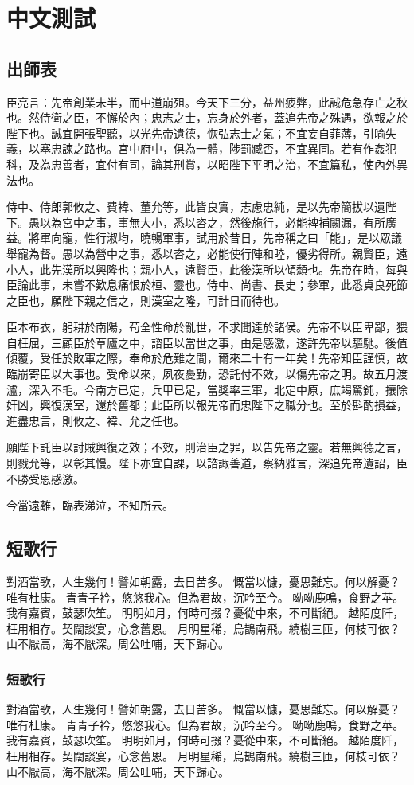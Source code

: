 
\chapter{中文測試}
\label{chp:chinese}

\section{出師表}

臣亮言：先帝創業未半，而中道崩殂。今天下三分，益州疲弊，此誠危急存亡之秋也。然侍衛之臣，不懈於內；忠志之士，忘身於外者，蓋追先帝之殊遇，欲報之於陛下也。誠宜開張聖聽，以光先帝遺德，恢弘志士之氣；不宜妄自菲薄，引喻失義，以塞忠諫之路也。宮中府中，俱為一體，陟罰臧否，不宜異同。若有作姦犯科，及為忠善者，宜付有司，論其刑賞，以昭陛下平明之治，不宜篇私，使內外異法也。\par

侍中、侍郎郭攸之、費褘、董允等，此皆良實，志慮忠純，是以先帝簡拔以遺陛下。愚以為宮中之事，事無大小，悉以咨之，然後施行，必能裨補闕漏，有所廣益。將軍向寵，性行淑均，曉暢軍事，試用於昔日，先帝稱之曰「能」，是以眾議舉寵為督。愚以為營中之事，悉以咨之，必能使行陣和睦，優劣得所。親賢臣，遠小人，此先漢所以興隆也；親小人，遠賢臣，此後漢所以傾頹也。先帝在時，每與臣論此事，未嘗不歎息痛恨於桓、靈也。侍中、尚書、長史；參軍，此悉貞良死節之臣也，願陛下親之信之，則漢室之隆，可計日而待也。

臣本布衣，躬耕於南陽，苟全性命於亂世，不求聞達於諸侯。先帝不以臣卑鄙，猥自枉屈，三顧臣於草廬之中，諮臣以當世之事，由是感激，遂許先帝以驅馳。後值傾覆，受任於敗軍之際，奉命於危難之間，爾來二十有一年矣！先帝知臣謹慎，故臨崩寄臣以大事也。受命以來，夙夜憂勤，恐託付不效，以傷先帝之明。故五月渡瀘，深入不毛。今南方已定，兵甲已足，當獎率三軍，北定中原，庶竭駑鈍，攘除奸凶，興復漢室，還於舊都；此臣所以報先帝而忠陛下之職分也。至於斟酌損益，進盡忠言，則攸之、褘、允之任也。

願陛下託臣以討賊興復之效；不效，則治臣之罪，以告先帝之靈。若無興德之言，則戮允等，以彰其慢。陛下亦宜自課，以諮諏善道，察納雅言，深追先帝遺詔，臣不勝受恩感激。

今當遠離，臨表涕泣，不知所云。

\section{短歌行}

對酒當歌，人生幾何！譬如朝露，去日苦多。
慨當以慷，憂思難忘。何以解憂？唯有杜康。
青青子衿，悠悠我心。但為君故，沉吟至今。
呦呦鹿鳴，食野之苹。我有嘉賓，鼓瑟吹笙。
明明如月，何時可掇？憂從中來，不可斷絕。
越陌度阡，枉用相存。契闊談宴，心念舊恩。
月明星稀，烏鵲南飛。繞樹三匝，何枝可依？
山不厭高，海不厭深。周公吐哺，天下歸心。

\subsection{短歌行}

對酒當歌，人生幾何！譬如朝露，去日苦多。
慨當以慷，憂思難忘。何以解憂？唯有杜康。
青青子衿，悠悠我心。但為君故，沉吟至今。
呦呦鹿鳴，食野之苹。我有嘉賓，鼓瑟吹笙。
明明如月，何時可掇？憂從中來，不可斷絕。
越陌度阡，枉用相存。契闊談宴，心念舊恩。
月明星稀，烏鵲南飛。繞樹三匝，何枝可依？
山不厭高，海不厭深。周公吐哺，天下歸心。